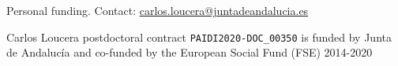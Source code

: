 \documentclass[compress,ignorenonframetext,aspectratio=1610,handout]{beamer}
\begin{document}
	\begin{frame}{Personal funding. Contact: \url{carlos.loucera@juntadeandalucia.es}}


		\vspace{0.3cm}

		Carlos Loucera postdoctoral contract \texttt{PAIDI2020-DOC\_00350} is funded by Junta de Andalucía and co-funded by the European Social Fund (FSE) 2014-2020

		\vspace{0.3cm}

		\begin{center}
		\end{center}
	\end{frame}

	\begin{frame}
		\vspace*{-1pt}
	\end{frame}
\end{document}
